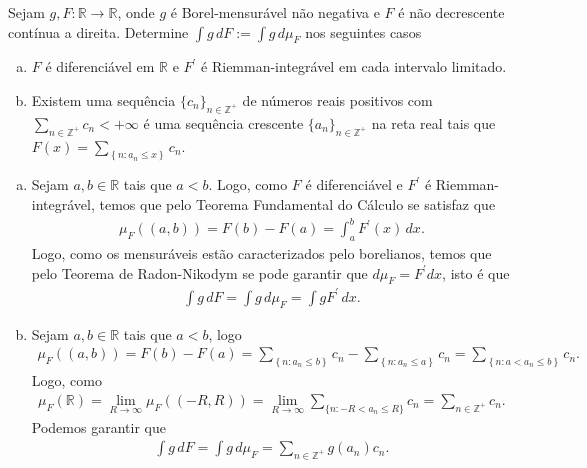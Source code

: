 \begin{homeworkProblem}[5]
  Sejam $g,F:\mathbb{R}\to \mathbb{R}$, onde $g$ é Borel-mensurável não negativa e $F$ é não decrescente contínua a direita. Determine $\int g\,dF:=\int g\,d\mu_F$ nos seguintes casos
  \begin{enumerate}[a)]
    \item $F$ é diferenciável em $\mathbb{R}$ e $F^{\prime}$ é Riemman-integrável em cada intervalo limitado.
    \item Existem uma sequência $\{c_n\}_{n\in\mathbb{Z}^{+}}$ de números reais positivos com $\sum_{n\in\mathbb{Z}^{+}}c_n<+\infty$ é uma sequência crescente $\{a_n\}_{n\in\mathbb{Z}^{+}}$ na reta real tais que $F(x)=\sum_{\left\{ n:a_n\leq x \right\}}c_n$.
  \end{enumerate}
  \begin{solution}
  \begin{enumerate}[a)]
    \item Sejam $a,b\in\mathbb{R}$ tais que $a<b$. Logo, como $F$ é diferenciável e $F^{\prime}$ é Riemman-integrável, temos que pelo Teorema Fundamental do Cálculo se satisfaz que
      \begin{align*}
        \mu_F((a,b))=F(b)-F(a)=\int_{a}^{b}F^{\prime}(x)\,dx.
      \end{align*}
      Logo, como os mensuráveis estão caracterizados pelo borelianos, temos que pelo Teorema de Radon-Nikodym se pode garantir que $d\mu_F=F^{\prime}dx$, isto é que
      \begin{align*}
        \int g\,dF=\int g\,d\mu_F=\int gF^{\prime}\,dx.
      \end{align*}
    \item Sejam $a,b\in\mathbb{R}$ tais que $a<b$, logo
      \begin{align*}
        \mu_F((a,b))=F(b)-F(a)=\sum_{\left\{ n:a_n\leq b \right\}}c_n-\sum_{\left\{ n:a_n\leq a \right\}}c_n=\sum_{\left\{ n:a< a_n\leq b \right\}}c_n.
      \end{align*}
      Logo, como 
      \begin{align*}
        \mu_F(\mathbb{R})=\lim_{R \to \infty}\mu_F((-R,R))=\lim_{R\to\infty}\sum_{\{n:-R<a_n\leq R\}}c_n=\sum_{n\in\mathbb{Z}^{+}}c_n.
      \end{align*}
      Podemos garantir que
      \begin{align*}
        \int g\,dF=\int g\,d\mu_F=\sum_{n\in\mathbb{Z}^{+}}g(a_n)c_n.
      \end{align*}
  \end{enumerate} 
  \end{solution}
\end{homeworkProblem}
